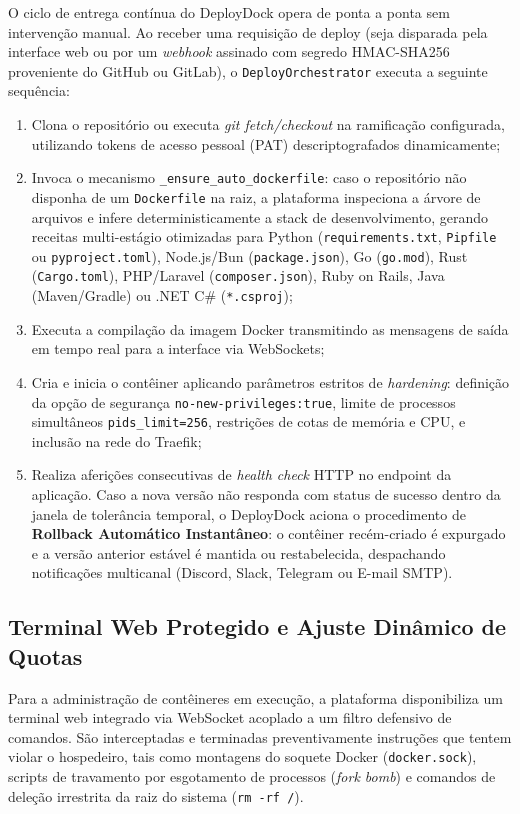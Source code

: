 O ciclo de entrega contínua do DeployDock opera de ponta a ponta sem intervenção manual. Ao receber uma requisição de deploy (seja disparada pela interface web ou por um \textit{webhook} assinado com segredo HMAC-SHA256 proveniente do GitHub ou GitLab), o \texttt{DeployOrchestrator} executa a seguinte sequência:
\begin{enumerate}
    \item Clona o repositório ou executa \textit{git fetch/checkout} na ramificação configurada, utilizando tokens de acesso pessoal (PAT) descriptografados dinamicamente;
    \item Invoca o mecanismo \texttt{\_ensure\_auto\_dockerfile}: caso o repositório não disponha de um \texttt{Dockerfile} na raiz, a plataforma inspeciona a árvore de arquivos e infere deterministicamente a stack de desenvolvimento, gerando receitas multi-estágio otimizadas para Python (\texttt{requirements.txt}, \texttt{Pipfile} ou \texttt{pyproject.toml}), Node.js/Bun (\texttt{package.json}), Go (\texttt{go.mod}), Rust (\texttt{Cargo.toml}), PHP/Laravel (\texttt{composer.json}), Ruby on Rails, Java (Maven/Gradle) ou .NET C\# (\texttt{*.csproj});
    \item Executa a compilação da imagem Docker transmitindo as mensagens de saída em tempo real para a interface via WebSockets;
    \item Cria e inicia o contêiner aplicando parâmetros estritos de \textit{hardening}: definição da opção de segurança \texttt{no-new-privileges:true}, limite de processos simultâneos \texttt{pids\_limit=256}, restrições de cotas de memória e CPU, e inclusão na rede do Traefik;
    \item Realiza aferições consecutivas de \textit{health check} HTTP no endpoint da aplicação. Caso a nova versão não responda com status de sucesso dentro da janela de tolerância temporal, o DeployDock aciona o procedimento de \textbf{Rollback Automático Instantâneo}: o contêiner recém-criado é expurgado e a versão anterior estável é mantida ou restabelecida, despachando notificações multicanal (Discord, Slack, Telegram ou E-mail SMTP).
\end{enumerate}

\subsection{Terminal Web Protegido e Ajuste Dinâmico de Quotas}
\label{sec:terminal-quotas}

Para a administração de contêineres em execução, a plataforma disponibiliza um terminal web integrado via WebSocket acoplado a um filtro defensivo de comandos. São interceptadas e terminadas preventivamente instruções que tentem violar o hospedeiro, tais como montagens do soquete Docker (\texttt{docker.sock}), scripts de travamento por esgotamento de processos (\textit{fork bomb}) e comandos de deleção irrestrita da raiz do sistema (\texttt{rm -rf /}).

